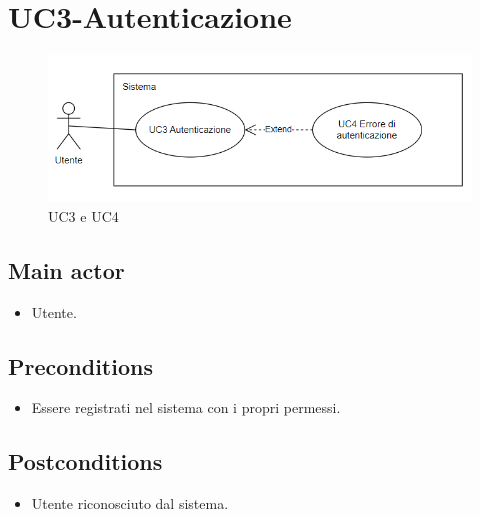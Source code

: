 \documentclass{article}
\begin{document}
\section{UC3-Autenticazione}
    \begin{figure}[h]
      \centering
      \includegraphics{./imgUML/UC3-AUTENTICAZIONE.png}
      \caption{UC3 e UC4}
      \label{fig:UC3 AUTENTICAZIONE}
    \end{figure} 
    
     \subsection*{Main actor}
         \begin{itemize}
             \item Utente.
         \end{itemize}
     \subsection*{Preconditions} 
        \begin{itemize}
            \item Essere registrati nel sistema con i propri permessi.
        \end{itemize}
               
    \subsection*{Postconditions}
        \begin{itemize}
            \item Utente riconosciuto dal sistema.
        \end{itemize}
\end{document}
